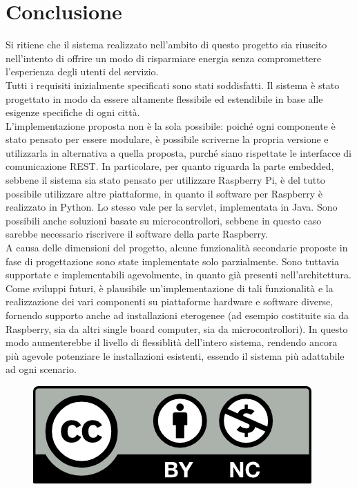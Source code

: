 \chapter{Conclusione} 

Si ritiene che il sistema realizzato nell'ambito di questo progetto sia riuscito nell'intento di offrire un modo di risparmiare energia senza compromettere l'esperienza degli utenti del servizio.
\\Tutti i requisiti inizialmente specificati sono stati soddisfatti. Il sistema è stato progettato in modo da essere altamente flessibile ed estendibile in base alle esigenze specifiche di ogni città.
\\L'implementazione proposta non è la sola possibile: poiché ogni componente è stato pensato per essere modulare, è possibile scriverne la propria versione e utilizzarla in alternativa a quella proposta, purché siano rispettate le interfacce di comunicazione REST.
In particolare, per quanto riguarda la parte embedded, sebbene il sistema sia stato pensato per utilizzare Raspberry Pi, è del tutto possibile utilizzare altre piattaforme, in quanto il software per Raspberry è realizzato in Python. Lo stesso vale per la servlet, implementata in Java.
Sono possibili anche soluzioni basate su microcontrollori, sebbene in questo caso sarebbe necessario riscrivere il software della parte Raspberry.
\\A causa delle dimensioni del progetto, alcune funzionalità secondarie proposte in fase di progettazione sono state implementate solo parzialmente. Sono tuttavia supportate e implementabili agevolmente, in quanto già presenti nell'architettura.
\\Come sviluppi futuri, è plausibile un'implementazione di tali funzionalità e la realizzazione dei vari componenti su piattaforme hardware e software diverse, fornendo supporto anche ad installazioni eterogenee (ad esempio costituite sia da Raspberry, sia da altri single board computer, sia da microcontrollori).
In questo modo aumenterebbe il livello di flessiblità dell'intero sistema, rendendo ancora più agevole potenziare le installazioni esistenti, essendo il sistema più adattabile ad ogni scenario.
\begin{figure}[b]
	\centering
	\includegraphics[scale=1.0]{figure/cc-by-nc.png}
\end{figure}
